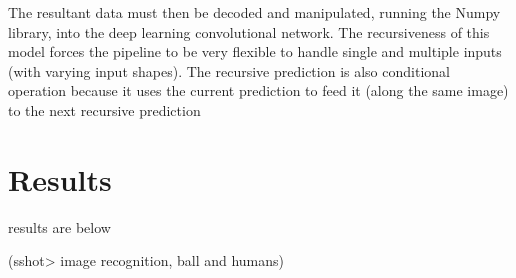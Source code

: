 \documentclass[
11pt,
twoside
]{report}
\begin{document}
The resultant data must then be decoded and manipulated, running the Numpy library, into the deep learning convolutional network. The recursiveness of this model forces the pipeline to be very flexible to handle single and multiple inputs (with varying input shapes). The recursive prediction is also conditional operation because it uses the current prediction to feed it (along the same image) to the next recursive prediction



\section{Results}

results are below

(sshot\textgreater{} image recognition, ball and humans)
\end{document}
